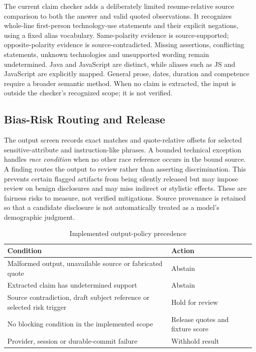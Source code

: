 \documentclass[conference]{IEEEtran}
\begin{document}
The current claim checker adds a deliberately limited resume-relative source comparison to both the answer and valid quoted observations. It recognizes whole-line first-person technology-use statements and their explicit negations, using a fixed alias vocabulary. Same-polarity evidence is source-supported; opposite-polarity evidence is source-contradicted. Missing assertions, conflicting statements, unknown technologies and unsupported wording remain undetermined. Java and JavaScript are distinct, while aliases such as JS and JavaScript are explicitly mapped. General prose, dates, duration and competence require a broader semantic method. When no claim is extracted, the input is outside the checker's recognized scope; it is not verified.

\subsection{Bias-Risk Routing and Release}
The output screen records exact matches and quote-relative offsets for selected sensitive-attribute and instruction-like phrases. A bounded technical exception handles \emph{race condition} when no other race reference occurs in the bound source. A finding routes the output to review rather than asserting discrimination. This prevents certain flagged artifacts from being silently released but may impose review on benign disclosures and may miss indirect or stylistic effects. These are fairness risks to measure, not verified mitigations. Source provenance is retained so that a candidate disclosure is not automatically treated as a model's demographic judgment.

\begin{table}[t]
\caption{Implemented output-policy precedence}
\label{tab:output-policy}
\centering
\begin{tabular}{@{}L{0.68\columnwidth}L{0.25\columnwidth}@{}}
\toprule
Condition & Action \\
\midrule
Malformed output, unavailable source or fabricated quote & Abstain \\
Extracted claim has undetermined support & Abstain \\
Source contradiction, draft subject reference or selected risk trigger & Hold for review \\
No blocking condition in the implemented scope & Release quotes and fixture score \\
Provider, session or durable-commit failure & Withhold result \\
\bottomrule
\end{tabular}
\end{table}
\end{document}
